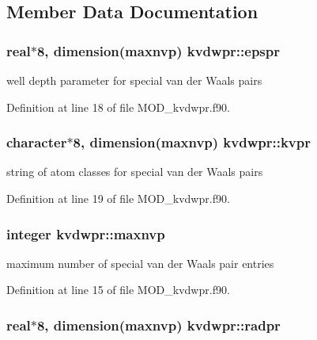 \subsection{Member Data Documentation}
\hypertarget{classkvdwpr_aefc977d08f7c4a7df5221f728481efe7}{
\subsubsection[{epspr}]{\setlength{\rightskip}{0pt plus 5cm}real$\ast$8, dimension({\bf maxnvp}) kvdwpr\-::epspr}}\label{classkvdwpr_aefc977d08f7c4a7df5221f728481efe7}


well depth parameter for special van der Waals pairs 



Definition at line 18 of file M\-O\-D\-\_\-kvdwpr.\-f90.

\hypertarget{classkvdwpr_af3a68e901602c7a68f74d10294fe54d2}{
\subsubsection[{kvpr}]{\setlength{\rightskip}{0pt plus 5cm}character$\ast$8, dimension({\bf maxnvp}) kvdwpr\-::kvpr}}\label{classkvdwpr_af3a68e901602c7a68f74d10294fe54d2}


string of atom classes for special van der Waals pairs 



Definition at line 19 of file M\-O\-D\-\_\-kvdwpr.\-f90.

\hypertarget{classkvdwpr_a953f1c95b2e2a786aba2e6ab070acba7}{
\subsubsection[{maxnvp}]{\setlength{\rightskip}{0pt plus 5cm}integer kvdwpr\-::maxnvp}}\label{classkvdwpr_a953f1c95b2e2a786aba2e6ab070acba7}


maximum number of special van der Waals pair entries 



Definition at line 15 of file M\-O\-D\-\_\-kvdwpr.\-f90.

\hypertarget{classkvdwpr_a16ab9500f997f0c7103d7d72d19c636a}{
\subsubsection[{radpr}]{\setlength{\rightskip}{0pt plus 5cm}real$\ast$8, dimension({\bf maxnvp}) kvdwpr\-::radpr}}\label{classkvdwpr_a16ab9500f997f0c7103d7d72d19c636a}


